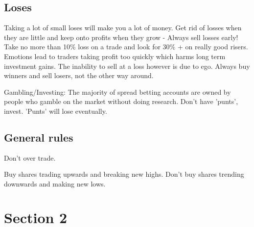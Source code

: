 \subsection*{Loses}
Taking a lot of small loses will make you a lot of money.
Get rid of losses when they are little and keep onto profits when they grow - Always sell losses early!
Take no more than 10\% loss on a trade and look for 30\% + on really good risers.
Emotions lead to traders taking profit too quickly which harms long term investment gains.
The inability to sell at a loss however is due to ego.
Always buy winners and sell losers, not the other way around.

Gambling/Investing: The majority of spread betting accounts are owned by people who gamble on the market without doing research.
Don't have 'punts', invest.
'Punts' will lose eventually.

\subsection*{General rules}
\begin{enumerate*}
\item Don't over trade.
\item Buy shares trading upwards and breaking new highs. Don't buy shares trending downwards and making new lows.
\end{enumerate*}

\section*{Section 2}








